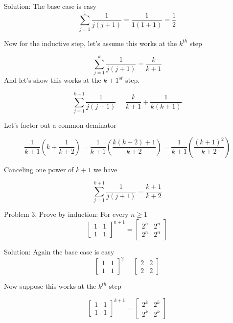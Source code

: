 \documentclass[16 pt]{amsart}
\theoremstyle{definition}
\theoremstyle{remark}
\numberwithin{equation}{subsection}
\newcommand{\half}{\frac{1}{2}}
\begin{document}
\vspace{1in}

Solution: The base case is easy
\[
\sum_{j=1}^{1} \frac{1}{j(j+1)} = \frac{1}{1(1+1)} = \half
\]

Now for the inductive step, let's assume this works at the $k^{th}$ step


\[
\sum_{j=1}^{k} \frac{1}{j(j+1)} = \frac{k}{k+1}
\]
And let's show this works at the $k+1^{st}$ step.

\[
\sum_{j=1}^{k+1} \frac{1}{j(j+1)} = \frac{k}{k+1} + \frac{1}{k(k+1)}
\]

Let's factor out a common deminator

\[
\frac{1}{k+1}\left(k + \frac{1}{k+2} \right) = \frac{1}{k+1}\left(\frac{k(k+2)+1}{k+2}\right) = \frac{1}{k+1}\left(\frac{(k+1)^2}{k+2}\right)
\]

Canceling one power of $k+1$ we have

\[
\sum_{j=1}^{k+1} \frac{1}{j(j+1)} = \frac{k+1}{k+2} 
\]



\newpage
Problem 3.
Prove by induction: For every $n\ge 1$
\[
\begin{bmatrix}
1&1\\
1&1
\end{bmatrix}^{n+1} = 
\begin{bmatrix}
2^n & 2^n \\
2^n & 2^n
\end{bmatrix}
\]


\vspace{1in}

Solution: Again the base case is easy
\[
\begin{bmatrix}
1&1\\
1&1
\end{bmatrix}^2 = 
\begin{bmatrix}
2 & 2 \\
2 & 2
\end{bmatrix}
\]

Now suppose this works at the $k^{th}$ step

\[
\begin{bmatrix}
1&1\\
1&1
\end{bmatrix}^{k+1} = 
\begin{bmatrix}
2^k & 2^k \\
2^k & 2^k
\end{bmatrix}
\]
\end{document}
